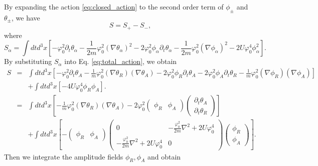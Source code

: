 \documentclass[aps,superscriptaddress,notitlepage,longbibliography]{revtex4-1}
\begin{document}
By expanding the action \eqref{eq:closed_action} to the second order
term of $\phi_{\pm}$ and $\theta_{\pm}$, we have 
\begin{equation}
S=S_{+}-S_{-},\label{eq:total_action}
\end{equation}
where 
\begin{equation}
S_{\alpha}=\int dtd^{3}x\left[-\varphi_{0}^{2}\partial_{t}\theta_{\alpha}-\frac{1}{2m}\varphi_{0}^{2}(\nabla\theta_{\alpha})^{2}-2\varphi_{0}^{2}\phi_{\alpha}\partial_{t}\theta_{\alpha}-\frac{1}{2m}\varphi_{0}^{2}(\nabla\phi_{\alpha})^{2}-2U\varphi_{0}^{4}\phi_{\alpha}^{2}\right].
\end{equation}
By substituting $S_{\alpha}$ into Eq. \eqref{eq:total_action}, we
obtain 
\begin{eqnarray}
S & = & \int dtd^{3}x\left[-\varphi_{0}^{2}\partial_{t}\theta_{A}-\frac{1}{m}\varphi_{0}^{2}(\nabla\theta_{R})(\nabla\theta_{A})-2\varphi_{0}^{2}\phi_{R}\partial_{t}\theta_{A}-2\varphi_{0}^{2}\phi_{A}\partial_{t}\theta_{R}-\frac{1}{m}\varphi_{0}^{2}(\nabla\phi_{R})(\nabla\phi_{A})\right]\nonumber \\
 &  & +\int dtd^{3}x[-4U\varphi_{0}^{4}\phi_{R}\phi_{A}].\nonumber \\
 & = & \int dtd^{3}x\left[-\frac{1}{m}\varphi_{0}^{2}(\nabla\theta_{R})(\nabla\theta_{A})-2\varphi_{0}^{2}\left(\begin{array}{cc}
\phi_{R} & \phi_{A}\end{array}\right)\left(\begin{array}{c}
\partial_{t}\theta_{A}\\
\partial_{t}\theta_{R}
\end{array}\right)\right]\nonumber \\
 &  & +\int dtd^{3}x\left[-\left(\begin{array}{cc}
\phi_{R} & \phi_{A}\end{array}\right)\left(\begin{array}{cc}
0 & -\frac{\varphi_{0}^{2}}{2m}\nabla^{2}+2U\varphi_{0}^{4}\\
-\frac{\varphi_{0}^{2}}{2m}\nabla^{2}+2U\varphi_{0}^{4} & 0
\end{array}\right)\left(\begin{array}{c}
\phi_{R}\\
\phi_{A}
\end{array}\right)\right].
\end{eqnarray}
Then we integrate the amplitude fields $\phi_{R},\phi_{A}$ and obtain
\end{document}
